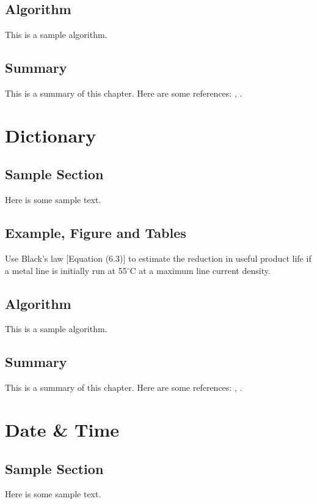 \documentclass{wileySix}
\begin{document}
\section{Algorithm}
This is a sample algorithm.

\section{Summary}
This is a summary of this chapter.
Here are some references: \cite{xkilby}, \cite{xberen}.

\chapter{Dictionary}

\section{Sample Section}
Here is some sample text.

\section{Example, Figure and Tables}
\vskip6pt
\begin{example}
	Use Black's law [Equation (6.3)] to estimate the reduction in useful product
	life if a metal line is initially run at 55$^\circ$C at a maximum line
	current density.
\end{example}

\section{Algorithm}
This is a sample algorithm.

\section{Summary}
This is a summary of this chapter.
Here are some references: \cite{xkilby}, \cite{xberen}.

\chapter{Date & Time}

\section{Sample Section}
Here is some sample text.
\end{document}
